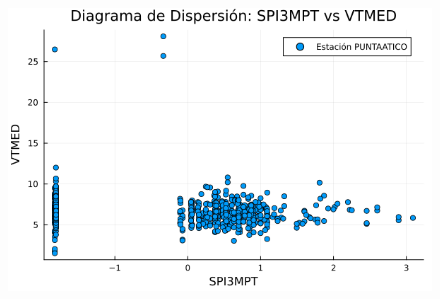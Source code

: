 \begin{figure}[htbp]
\begin{minipage}{0.32\textwidth}
    \includegraphics[width=\linewidth]{Capitulos/Scaterplot/PUNTAATICO_SPI3MPT_vs_VTMED.png}
\end{minipage}

\vspace{0.5cm}  %


\end{figure}

